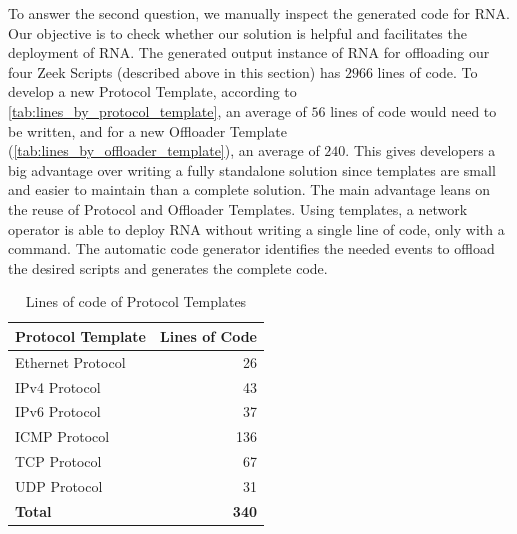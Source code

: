 To answer the second question, we manually inspect the generated code for RNA. Our objective is to check whether our solution is helpful and facilitates the deployment of RNA. The generated output instance of RNA for offloading our four Zeek Scripts (described above in this section) has $2966$ lines of code. To develop a new Protocol Template, according to \autoref{tab:lines_by_protocol_template}, an average of $56$ lines of code would need to be written, and for a new Offloader Template (\autoref{tab:lines_by_offloader_template}), an average of $240$. This gives developers a big advantage over writing a fully standalone solution since templates are small and easier to maintain than a complete solution. The main advantage leans on the reuse of Protocol and Offloader Templates. Using templates, a network operator is able to deploy RNA without writing a single line of code, only with a command. The automatic code generator identifies the needed events to offload the desired scripts and generates the complete code.

\begin{table}[htb]
    \caption{Lines of code of Protocol Templates}
    \begin{center}
        \begin{tabular}{|l|r|}
            \hline
            Protocol Template & Lines of Code \\ \hline
            Ethernet Protocol & 26            \\ \hline
            IPv4 Protocol     & 43            \\ \hline
            IPv6 Protocol     & 37            \\ \hline
            ICMP Protocol     & 136           \\ \hline
            TCP Protocol      & 67            \\ \hline
            UDP Protocol      & 31            \\ \hline
            \textbf{Total}    & \textbf{340}  \\ \hline
        \end{tabular}%
    \end{center}
    \label{tab:lines_by_protocol_template}
\end{table}

